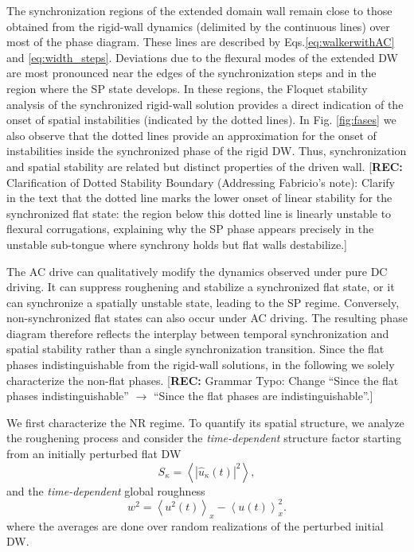 \documentclass[prb,aps,twocolumn,superscriptaddress,floatfix]{revtex4-1}
\newcommand{\rec}[1]{{\color{magenta}[\textbf{REC:} #1]}}
\begin{document}
The synchronization regions of the extended domain wall remain close to those obtained from the rigid-wall dynamics (delimited by the continuous lines) over most of the phase diagram. These lines are described by Eqs.\eqref{eq:walkerwithAC} and \eqref{eq:width_steps}. 
Deviations due to the flexural modes of the extended DW are most pronounced near the edges of the synchronization steps and in the region where the SP state develops. In these regions, the Floquet stability analysis of the synchronized rigid-wall solution provides a direct indication of the onset of spatial instabilities (indicated by the dotted lines). In Fig. \ref{fig:fases} we also observe that the dotted lines provide an approximation for the onset of instabilities inside the synchronized phase of the rigid DW.
Thus, synchronization and spatial stability are related but distinct properties of the driven wall. 
\rec{Clarification of Dotted Stability Boundary (Addressing Fabricio's note): Clarify in the text that the dotted line marks the lower onset of linear stability for the synchronized flat state: the region below this dotted line is linearly unstable to flexural corrugations, explaining why the SP phase appears precisely in the unstable sub-tongue where synchrony holds but flat walls destabilize.}

The AC drive can qualitatively modify the dynamics observed under pure DC driving. It can suppress roughening and stabilize a synchronized flat state, or it can synchronize a spatially unstable state, leading to the SP regime. Conversely, non-synchronized flat states can also occur under AC driving. The resulting phase diagram therefore reflects the interplay between temporal synchronization and spatial stability rather than a single synchronization transition.
Since the flat phases indistinguishable from the rigid-wall solutions, in the following we solely characterize the non-flat phases.
\rec{Grammar Typo: Change ``Since the flat phases indistinguishable'' $\to$ ``Since the flat phases are indistinguishable''.}


We first characterize the NR regime. To quantify its spatial structure, we analyze the roughening process and consider the \textit{time-dependent} structure factor starting from an initially perturbed flat DW
\begin{equation}
    S_\kappa = \left\langle\left|\hat u_\kappa(t)\right|^2\right\rangle ,
    \label{eq:factor_estructura}
\end{equation}
and the \textit{time-dependent} global roughness 
\begin{equation}
w^2 =
\left\langle u^2(t)\right\rangle_x
-\left\langle u(t)\right\rangle_x^2
.
\label{eq:roughness}
\end{equation} 
where the averages are done over random realizations of the perturbed initial DW. 
\end{document}
